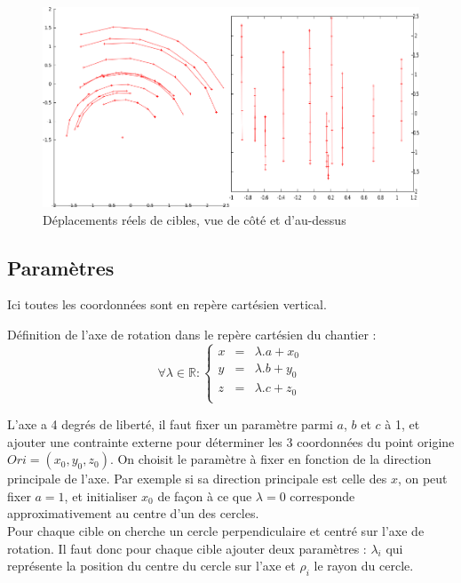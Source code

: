 \documentclass[french]{report}
\begin{document}
\begin{figure}[h]
\centering
\includegraphics[width = 14cm]{images/axis2}
\caption{Déplacements réels de cibles, vue de côté et d'au-dessus}
\end{figure}

\newpage

\subsection{Paramètres}

Ici toutes les coordonnées sont en repère cartésien vertical.

Définition de l'axe de rotation dans le repère cartésien du chantier :
$$ \forall \lambda \in \mathbb{R} :
  \left\{\begin{array}{rcr}
    x & = & \lambda . a + x_0 \\
    y & = & \lambda . b + y_0 \\
    z & = & \lambda . c + z_0 \\
  \end{array}\right.
 $$

L'axe a 4 degrés de liberté, il faut fixer un paramètre parmi $a$, $b$ et $c$  à 1, et ajouter une contrainte externe pour déterminer les 3 coordonnées du point origine $Ori=(x_0,y_0,z_0)$.
On choisit le paramètre à fixer en fonction de la direction principale de l'axe.
Par exemple si sa direction principale est celle des $x$, on peut fixer $ a = 1 $, et initialiser $ x_0 $ de façon à ce que $\lambda = 0$ corresponde approximativement au centre d'un des cercles.
\\

Pour chaque cible on cherche un cercle perpendiculaire et centré sur l'axe de rotation. Il faut donc pour chaque cible ajouter deux paramètres :
$\lambda_i$ qui représente la position du centre du cercle sur l'axe et $\rho_i$ le rayon du cercle.
\end{document}
